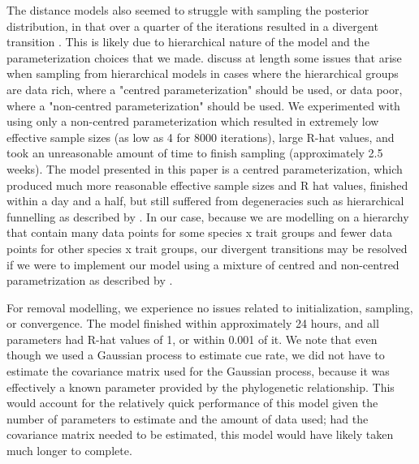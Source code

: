 \documentclass[12pt]{article}
\begin{document}
\par The distance models also seemed to struggle with sampling the posterior distribution, in that over a quarter of the iterations resulted in a divergent transition \citep{betancourt_diagnosing_2016, leimkuhler_simulating_2005}.
This is likely due to hierarchical nature of the model and the parameterization choices that we made.
\citet{betancourt_hierarchical_2020} discuss at length some issues that arise when sampling from hierarchical models in cases where the hierarchical groups are data rich, where a "centred parameterization" should be used, or data poor, where a "non-centred parameterization" should be used.
We experimented with using only a non-centred parameterization which resulted in extremely low effective sample sizes (as low as 4 for 8000 iterations), large R-hat values, and took an unreasonable amount of time to finish sampling (approximately 2.5 weeks).
The model presented in this paper is a centred parameterization, which produced much more reasonable effective sample sizes and R hat values, finished within a day and a half, but still suffered from degeneracies such as hierarchical funnelling as described by \citet{betancourt_hierarchical_2020}.
In our case, because we are modelling on a hierarchy that contain many data points for some species x trait groups and fewer data points for other species x trait groups, our divergent transitions may be resolved if we were to implement our model using a mixture of centred and non-centred parametrization as described by \citet{betancourt_hierarchical_2020}.

\par For removal modelling, we experience no issues related to initialization, sampling, or convergence. 
The model finished within approximately 24 hours, and all parameters had R-hat values of 1, or within 0.001 of it.
We note that even though we used a Gaussian process to estimate cue rate, we did not have to estimate the covariance matrix used for the Gaussian process, because it was effectively a known parameter provided by the phylogenetic relationship.
This would account for the relatively quick performance of this model given the number of parameters to estimate and the amount of data used; had the covariance matrix needed to be estimated, this model would have likely taken much longer to complete.
\end{document}
